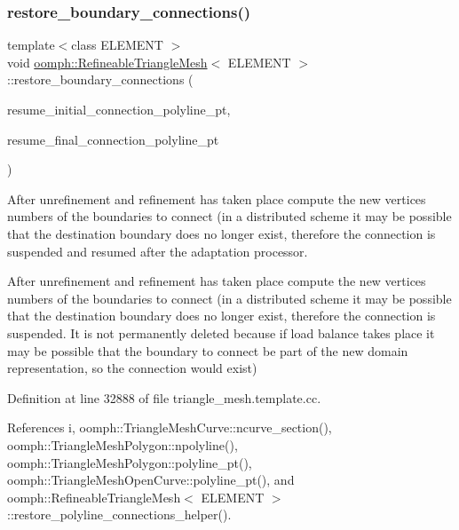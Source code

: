 \subsubsection{\texorpdfstring{restore\+\_\+boundary\+\_\+connections()}{restore\_boundary\_connections()}}
{\footnotesize\ttfamily template$<$class E\+L\+E\+M\+E\+NT $>$ \\
void \hyperlink{classoomph_1_1RefineableTriangleMesh}{oomph\+::\+Refineable\+Triangle\+Mesh}$<$ E\+L\+E\+M\+E\+NT $>$\+::restore\+\_\+boundary\+\_\+connections (\begin{DoxyParamCaption}\item[{\hyperlink{classoomph_1_1Vector}{Vector}$<$ \hyperlink{classoomph_1_1TriangleMeshPolyLine}{Triangle\+Mesh\+Poly\+Line} $\ast$$>$ \&}]{resume\+\_\+initial\+\_\+connection\+\_\+polyline\+\_\+pt,  }\item[{\hyperlink{classoomph_1_1Vector}{Vector}$<$ \hyperlink{classoomph_1_1TriangleMeshPolyLine}{Triangle\+Mesh\+Poly\+Line} $\ast$$>$ \&}]{resume\+\_\+final\+\_\+connection\+\_\+polyline\+\_\+pt }\end{DoxyParamCaption})\hspace{0.3cm}{\ttfamily [protected]}}



After unrefinement and refinement has taken place compute the new vertices numbers of the boundaries to connect (in a distributed scheme it may be possible that the destination boundary does no longer exist, therefore the connection is suspended and resumed after the adaptation processor. 

After unrefinement and refinement has taken place compute the new vertices numbers of the boundaries to connect (in a distributed scheme it may be possible that the destination boundary does no longer exist, therefore the connection is suspended. It is not permanently deleted because if load balance takes place it may be possible that the boundary to connect be part of the new domain representation, so the connection would exist) 

Definition at line 32888 of file triangle\+\_\+mesh.\+template.\+cc.



References i, oomph\+::\+Triangle\+Mesh\+Curve\+::ncurve\+\_\+section(), oomph\+::\+Triangle\+Mesh\+Polygon\+::npolyline(), oomph\+::\+Triangle\+Mesh\+Polygon\+::polyline\+\_\+pt(), oomph\+::\+Triangle\+Mesh\+Open\+Curve\+::polyline\+\_\+pt(), and oomph\+::\+Refineable\+Triangle\+Mesh$<$ E\+L\+E\+M\+E\+N\+T $>$\+::restore\+\_\+polyline\+\_\+connections\+\_\+helper().

